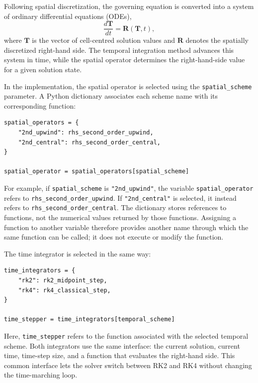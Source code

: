 Following spatial discretization, the governing equation is converted into a system of ordinary differential equations (ODEs),
\begin{equation}
    \frac{d\mathbf{T}}{dt} = \mathbf{R}(\mathbf{T},t),
    \label{eq:semi-discrete-system}
\end{equation}
where $\mathbf{T}$ is the vector of cell-centred solution values and $\mathbf{R}$ denotes the spatially discretized right-hand side. The temporal integration method advances this system in time, while the spatial operator determines the right-hand-side value for a given solution state.

In the implementation, the spatial operator is selected using the \texttt{spatial\_scheme} parameter. A Python dictionary associates each scheme name with its corresponding function:

\begin{verbatim}
spatial_operators = {
    "2nd_upwind": rhs_second_order_upwind,
    "2nd_central": rhs_second_order_central,
}

spatial_operator = spatial_operators[spatial_scheme]
\end{verbatim}

For example, if \texttt{spatial\_scheme} is \texttt{"2nd\_upwind"}, the variable \texttt{spatial\_operator} refers to \texttt{rhs\_second\_order\_upwind}. If \texttt{"2nd\_central"} is selected, it instead refers to \texttt{rhs\_second\_order\_central}. The dictionary stores references to functions, not the numerical values returned by those functions. Assigning a function to another variable therefore provides another name through which the same function can be called; it does not execute or modify the function.

The time integrator is selected in the same way:

\begin{verbatim}
time_integrators = {
    "rk2": rk2_midpoint_step,
    "rk4": rk4_classical_step,
}

time_stepper = time_integrators[temporal_scheme]
\end{verbatim}

Here, \texttt{time\_stepper} refers to the function associated with the selected temporal scheme. Both integrators use the same interface: the current solution, current time, time-step size, and a function that evaluates the right-hand side. This common interface lets the solver switch between RK2 and RK4 without changing the time-marching loop.

